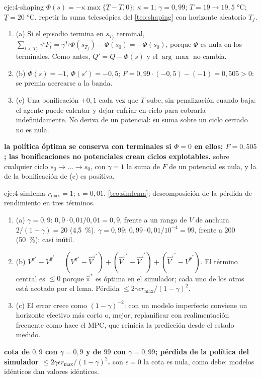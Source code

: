 \begin{solucion}{eje:4-shaping}
\datos $\Phi(s)=-\kappa\max\{\underline T-T,0\}$; $\kappa=1$; $\gamma=0{,}99$; $T=19\to19{,}5$ °C; $\underline T=20$ °C.
\planteamiento repetir la suma telescópica del \cref{teo:shaping} con horizonte aleatorio $T_f$.
\pasos
\begin{enumerate}[label=\arabic*.]
  \item (a) Si el episodio termina en $s_{T_f}$ terminal, $\sum_{t<T_f}\gamma^{t}F_t=\gamma^{T_f}\Phi(s_{T_f})-\Phi(s_0)=-\Phi(s_0)$, porque $\Phi$ es nula en los terminales. Como antes, $Q'=Q-\Phi(s)$ y el $\arg\max$ no cambia.
  \item (b) $\Phi(s)=-1$, $\Phi(s')=-0{,}5$; $F=0{,}99\cdot(-0{,}5)-(-1)=0{,}505>0$: se premia acercarse a la banda.
  \item (c) Una bonificación $+0{,}1$ cada vez que $T$ sube, sin penalización cuando baja: el agente puede calentar y dejar enfriar en ciclo para cobrarla indefinidamente. No deriva de un potencial: su suma sobre un ciclo cerrado no es nula.
\end{enumerate}
\resultado \textbf{la política óptima se conserva con terminales si $\Phi=0$ en ellos; $F=0{,}505$; las bonificaciones no potenciales crean ciclos explotables.}
\comprobacion sobre cualquier ciclo $s_0\to\dots\to s_0$, con $\gamma=1$ la suma de $F$ de un potencial es nula, y la de la bonificación de (c) es positiva.
\end{solucion}

\begin{solucion}{eje:4-simlema}
\datos $r_{\max}=1$; $\epsilon=0{,}01$.
\planteamiento \cref{teo:simlema}; descomposición de la pérdida de rendimiento en tres términos.
\pasos
\begin{enumerate}[label=\arabic*.]
  \item (a) $\gamma=0{,}9$: $0{,}9\cdot0{,}01/0{,}01=0{,}9$, frente a un rango de $V$ de anchura $2/(1-\gamma)=20$ (4,5~\%). $\gamma=0{,}99$: $0{,}99\cdot0{,}01/10^{-4}=99$, frente a 200 (50~\%): casi inútil.
  \item (b) $V^{\pi^{*}}-V^{\hat\pi^{*}}=(V^{\pi^{*}}-\hat V^{\pi^{*}})+(\hat V^{\pi^{*}}-\hat V^{\hat\pi^{*}})+(\hat V^{\hat\pi^{*}}-V^{\hat\pi^{*}})$. El término central es $\le0$ porque $\hat\pi^{*}$ es óptima en el simulador; cada uno de los otros está acotado por el lema. Pérdida $\le2\gamma\epsilon r_{\max}/(1-\gamma)^{2}$.
  \item (c) El error crece como $(1-\gamma)^{-2}$: con un modelo imperfecto conviene un horizonte efectivo más corto o, mejor, replanificar con realimentación frecuente como hace el MPC, que reinicia la predicción desde el estado medido.
\end{enumerate}
\resultado \textbf{cota de $0{,}9$ con $\gamma=0{,}9$ y de $99$ con $\gamma=0{,}99$; pérdida de la política del simulador $\le2\gamma\epsilon r_{\max}/(1-\gamma)^{2}$.}
\comprobacion con $\epsilon=0$ la cota es nula, como debe: modelos idénticos dan valores idénticos.
\end{solucion}

